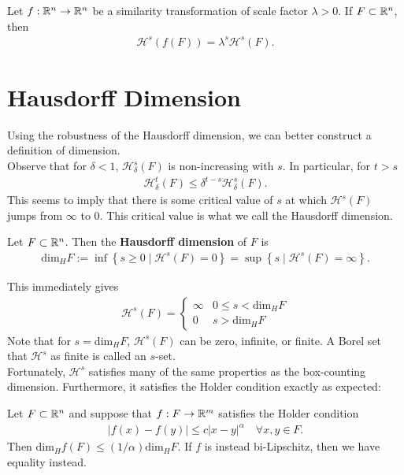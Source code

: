 \documentclass{memoir}
\begin{document}
\begin{prop}
	Let \(f:\mathbb{R}^{n}\to \mathbb{R}^{n}\) be a similarity transformation of scale factor \(\lambda>0\). If \(F\subset \mathbb{R}^{n}\), then
	\begin{align*}
		\mathcal{H}^{s}(f(F)) = \lambda^{s}\mathcal{H}^{s}(F).
	\end{align*}
\end{prop}

\section{Hausdorff Dimension}
\label{sec:hausdorff_dimension}

Using the robustness of the Hausdorff dimension, we can better construct a definition of dimension.\\

Observe that for \(\delta<1\), \(\mathcal{H}^{s}_{\delta}(F)\) is non-increasing with \(s\). In particular, for \(t>s\)
 \begin{align*}
	 \mathcal{H}^{t}_\delta(F) \leq \delta^{t-s}\mathcal{H}^{s}_{\delta}(F).
\end{align*}
This seems to imply that there is some critical value of \(s\) at which \(\mathcal{H}^{s}(F)\) jumps from \(\infty\) to \(0\). This critical value is what we call the Hausdorff dimension.

\begin{defn}
	Let \(F \subset \mathbb{R}^{n}\). Then the \textbf{Hausdorff dimension} of \(F\) is
	\begin{align*}
		\textrm{dim}_H F := \inf \left\{s \geq 0 \mid \mathcal{H}^{s}(F) = 0 \right\} = \sup \left\{s \mid \mathcal{H}^{s}(F) = \infty \right\} .
	\end{align*}
\end{defn}
This immediately gives
\begin{align*}
	\mathcal{H}^{s}(F) = \begin{cases}
		\infty & 0\leq s< \textrm{dim}_H F\\
		0 & s> \textrm{dim}_H F
	\end{cases}
\end{align*}
Note that for \(s =  \textrm{dim}_H F\), \(\mathcal{H}^{s}(F)\) can be zero, infinite, or finite. A Borel set that \(\mathcal{H}^{s}\) as finite is called an \(s\)-set.\\

Fortunately, \(\mathcal{H}^{s}\) satisfies many of the same properties as the box-counting dimension. Furthermore, it satisfies the Holder condition exactly as expected:
\begin{prop}
	Let \(F\subset \mathbb{R}^{n}\) and suppose that \(f:F\to \mathbb{R}^{m}\) satisfies the Holder condition
	\begin{align*}
		\left| f(x)-f(y) \right| \leq c \left| x-y \right|^{\alpha} \quad \forall x,y \in F.
	\end{align*}
	Then \( \textrm{dim}_H f(F) \leq (1 / \alpha) \textrm{dim}_H F\). If \(f\) is instead bi-Lipschitz, then we have equality instead.
\end{prop}
\end{document}

